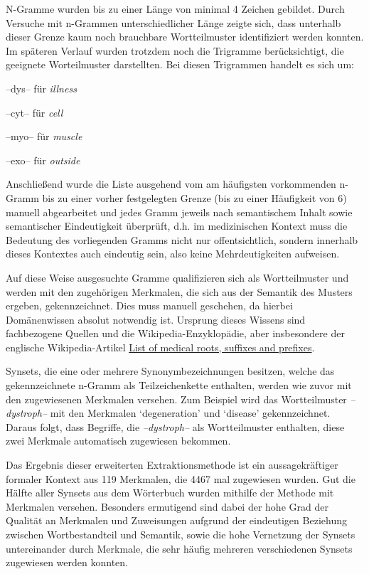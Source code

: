 \documentclass[pagesize,DIV=calc,12pt,draft]{scrreprt}
\begin{document}
N-Gramme wurden bis zu einer Länge von minimal 4 Zeichen gebildet. 
Durch Versuche mit n-Grammen unterschiedlicher Länge zeigte sich, dass unterhalb dieser Grenze kaum noch brauchbare Wortteilmuster identifiziert werden konnten. 
Im späteren Verlauf wurden trotzdem noch die Trigramme berücksichtigt, die geeignete Worteilmuster darstellten. 
Bei diesen Trigrammen handelt es sich um:

\begin{inparaenum}
\item --dys-- für \emph{illness}

\item --cyt-- für \emph{cell}

\item --myo-- für \emph{muscle}

\item --exo-- für \emph{outside}
\end{inparaenum}

Anschließend wurde die Liste ausgehend vom am häufigsten vorkommenden n-Gramm bis zu einer vorher festgelegten Grenze (bis zu einer Häufigkeit von 6) manuell abgearbeitet und jedes Gramm jeweils nach semantischem Inhalt sowie semantischer Eindeutigkeit überprüft, d.h. im medizinischen Kontext muss die Bedeutung des vorliegenden Gramms nicht nur offentsichtlich, sondern innerhalb dieses Kontextes auch eindeutig sein, also keine Mehrdeutigkeiten aufweisen. 

Auf diese Weise ausgesuchte Gramme qualifizieren sich als Wortteilmuster und werden mit den zugehörigen Merkmalen, die sich aus der Semantik des Musters ergeben, gekennzeichnet. 
Dies muss manuell geschehen, da hierbei Domänenwissen absolut notwendig ist. 
Ursprung dieses Wissens sind fachbezogene Quellen und die Wikipedia-Enzyklopädie, aber insbesondere der englische Wikipedia-Artikel \href{http://en.wikipedia.org/wiki/List_of_medical_roots,_suffixes_and_prefixes}{List of medical roots, suffixes and prefixes}. 

Synsets, die eine oder mehrere Synonymbezeichnungen besitzen, welche das gekennzeichnete n-Gramm als Teilzeichenkette enthalten, werden wie zuvor mit den zugewiesenen Merkmalen versehen. 
Zum Beispiel wird das Wortteilmuster \emph{--dystroph--} mit den Merkmalen `degeneration' und `disease' gekennzeichnet. 
Daraus folgt, dass Begriffe, die \emph{--dystroph--} als Wortteilmuster enthalten, diese zwei Merkmale automatisch zugewiesen bekommen. 

Das Ergebnis dieser erweiterten Extraktionsmethode ist ein aussagekräftiger formaler Kontext aus 119 Merkmalen, die 4467 mal zugewiesen wurden. 
Gut die Hälfte aller Synsets aus dem Wörterbuch wurden mithilfe der Methode mit Merkmalen versehen. 
Besonders ermutigend sind dabei der hohe Grad der Qualität an Merkmalen und Zuweisungen aufgrund der eindeutigen Beziehung zwischen Wortbestandteil und Semantik, sowie die hohe Vernetzung der Synsets untereinander durch Merkmale, die sehr häufig mehreren verschiedenen Synsets zugewiesen werden konnten. 
\end{document}
